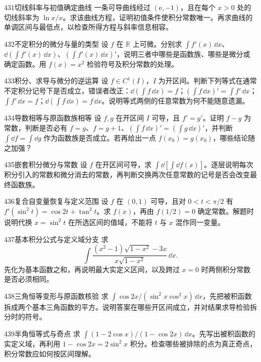 \begin{exercise}{431}{切线斜率与初值确定曲线}
一条可导曲线经过 $(\mathrm e,-1)$，且在每个 $x>0$ 处的切线斜率为 $\ln x/x$。求该曲线方程，证明初值条件使积分常数唯一。再求曲线的单调区间与最低点，以检查所得方程与斜率信息相容。
\end{exercise}
\begin{exercise}{432}{不定积分的微分与量的类型}
设 $f$ 在 $\mathbb R$ 上可微。分别求 $\int f'(x)\,\dd x$、$\dd(\int f'(x)\,\dd x)$、$(\int f'(x)\,\dd x)'$，说明三者中哪些是函数族、哪些是微分或确定函数。用 $f(x)=x^2$ 检验符号及积分常数的处理。
\end{exercise}
\begin{exercise}{433}{积分、求导与微分的逆运算}
设 $f\in C^1(I)$，$I$ 为开区间。判断下列等式在通常不定积分记号下是否成立，错误者改正：$\dd(\int f\,\dd x)=f$；$(\int f\,\dd x)'=\int f'\,\dd x$；$\int f'\,\dd x=f$；$\dd(\int f\,\dd x)=f\,\dd x$。说明等式两侧的任意常数为何不能随意遗漏。
\end{exercise}
\begin{exercise}{434}{导数相等与原函数族相等}
设 $f,g$ 在开区间 $I$ 可导，且 $f'=g'$。证明 $f-g$ 为常数，判断是否必有 $f=g$、$f=g+1$、$(\int f\,\dd x)'=(\int g\,\dd x)'$，并判断 $\int\dd f=\int\dd g$ 作为函数族是否成立。若再给出一点 $f(x_0)=g(x_0)$，哪些结论随之加强？
\end{exercise}
\begin{exercise}{435}{嵌套积分微分与常数}
设 $f$ 在开区间可导，求 $\int\dd[\int\dd f(x)]$。逐层说明每次积分引入的常数和微分消去的常数，再判断交换两次任意常数的记号是否会改变最终函数族。
\end{exercise}
\begin{exercise}{436}{复合自变量恢复与定义范围}
设 $f$ 在 $(0,1)$ 可导，且对 $0<t<\pi/2$ 有 $f'(\sin^2t)=\cos2t+\tan^2t$。求 $f(x)$，再由 $f(1/2)=0$ 确定常数。解题时说明代换 $x=\sin^2t$ 在所选区间的值域，不能将 $t$ 与 $x$ 混作同一变量。
\end{exercise}
\begin{exercise}{437}{基本积分公式与定义域分支}
求
\[\int\frac{(x^2-1)\sqrt{1-x^2}-3x}{x\sqrt{1-x^2}}\,\dd x.\]
先化为基本函数之和，再说明最大实定义区间，以及跨过 $x=0$ 时两侧积分常数是否必须相同。
\end{exercise}
\begin{exercise}{438}{三角恒等变形与原函数核验}
求 $\int\cos2x/(\sin^2x\cos^2x)\,\dd x$，先把被积函数拆成两个基本三角函数的平方。说明答案在哪些开区间成立，并对结果求导检验拆分时的符号。
\end{exercise}
\begin{exercise}{439}{半角恒等式与奇点}
求 $\int(1-2\cos x)/(1-\cos2x)\,\dd x$。先写出被积函数的实定义域，再利用 $1-\cos2x=2\sin^2x$ 积分。检查哪些被排除的点为真正奇点，积分常数应如何按区间理解。
\end{exercise}
